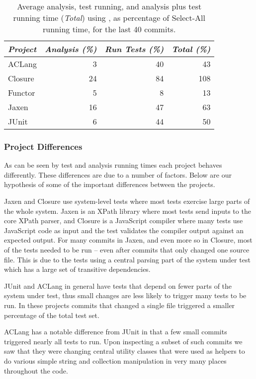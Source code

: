 {\begin{table}[h]
  \centering
\begin{tabular}{l|r|r|r}
  \emph{Project} & \emph{Analysis (\%)} & \emph{Run Tests (\%)} & \emph{Total (\%)} \\
  \hline
  ACLang  &      3 &       40 &   43 \\
 Closure  &     24 &       84 &  108 \\
 Functor  &      5 &        8 &   13 \\
   Jaxen  &     16 &       47 &   63 \\
   JUnit  &      6 &       44 &   50 \\
  \hline
\end{tabular}
\caption{Average analysis, test running, and analysis plus test running time
(\emph{Total}) using \ourtool{}, as percentage of Select-All running time, for the last 40
commits.}
\label{tbl:averages}
\end{table}

\subsubsection{Project Differences}

As can be seen by test and analysis running times each project behaves differently.
These differences are due to a number of factors. Below are our hypothesis of some
of the important differences between the projects.

Jaxen and Closure use system-level tests where most tests exercise large parts of the whole system.
Jaxen is an XPath library where most tests send inputs to the core XPath parser, and Closure is a
JavaScript compiler where many tests use JavaScript code as input and the test validates the
compiler output against an expected output. For many commits in Jaxen, and even more so in Closure,
most of the tests needed to be run -- even after commits that only changed one source file. This is
due to the tests using a central parsing part of the system under test which has a large set of
transitive dependencies.

JUnit and ACLang in general have tests that depend on fewer parts of the system under test, thus
small changes are less likely to trigger many tests to be run. In these projects commits that
changed a single file triggered a smaller percentage of the total test set.

ACLang has a notable difference from JUnit in that a few small commits triggered nearly all tests to
run. Upon inspecting a subset of such commits we saw that they were changing central utility classes
that were used as helpers to do various simple string and collection manipulation in very many
places throughout the code.

}
